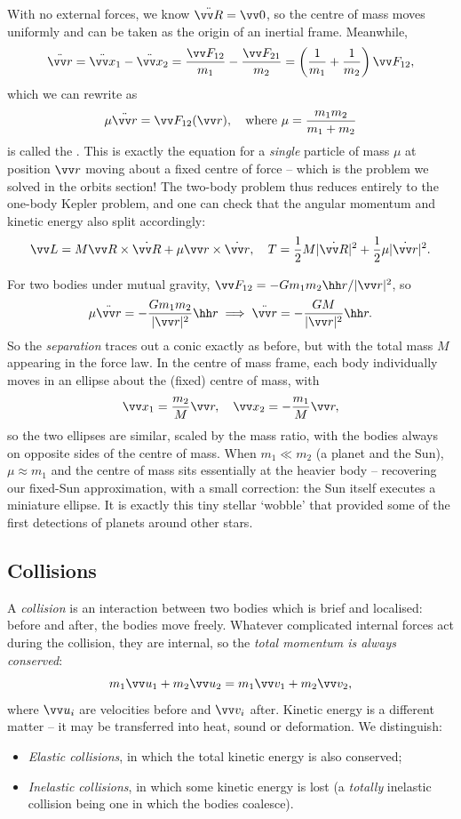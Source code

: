 With no external forces, we know $\ddot{\vv R} = \vv 0$, so the centre of mass moves uniformly and can be taken as the origin of an inertial frame. Meanwhile,
$$
\ddot{\vv r} = \ddot{\vv x}_1 - \ddot{\vv x}_2 = \frac{\vv F_{12}}{m_1} - \frac{\vv F_{21}}{m_2} = \left(\frac{1}{m_1} + \frac{1}{m_2}\right)\vv F_{12},
$$
which we can rewrite as
$$
\mu \ddot{\vv r} = \vv F_{12}(\vv r), \quad \text{where } \mu = \frac{m_1 m_2}{m_1 + m_2}
$$
is called the . This is exactly the equation for a \emph{single} particle of mass $\mu$ at position $\vv r$ moving about a fixed centre of force -- which is the problem we solved in the orbits section! The two-body problem thus reduces entirely to the one-body Kepler problem, and one can check that the angular momentum and kinetic energy also split accordingly:
$$
\vv L = M \vv R \times \dot{\vv R} + \mu \vv r \times \dot{\vv r}, \quad T = \frac{1}{2}M|\dot{\vv R}|^2 + \frac{1}{2}\mu |\dot{\vv r}|^2.
$$

\begin{example}
	For two bodies under mutual gravity, $\vv F_{12} = -Gm_1m_2 \hh r/|\vv r|^2$, so
	$$
	\mu \ddot{\vv r} = -\frac{Gm_1m_2}{|\vv r|^2}\hh r \implies \ddot{\vv r} = -\frac{GM}{|\vv r|^2}\hh r.
	$$
	So the \emph{separation} traces out a conic exactly as before, but with the total mass $M$ appearing in the force law. In the centre of mass frame, each body individually moves in an ellipse about the (fixed) centre of mass, with
	$$
	\vv x_1 = \frac{m_2}{M}\vv r, \quad \vv x_2 = -\frac{m_1}{M}\vv r,
	$$
	so the two ellipses are similar, scaled by the mass ratio, with the bodies always on opposite sides of the centre of mass. When $m_1 \ll m_2$ (a planet and the Sun), $\mu \approx m_1$ and the centre of mass sits essentially at the heavier body -- recovering our fixed-Sun approximation, with a small correction: the Sun itself executes a miniature ellipse. It is exactly this tiny stellar `wobble' that provided some of the first detections of planets around other stars.
\end{example}

\subsection{Collisions}

A \emph{collision} is an interaction between two bodies which is brief and localised: before and after, the bodies move freely. Whatever complicated internal forces act during the collision, they are internal, so the \emph{total momentum is always conserved}:
$$
m_1 \vv u_1 + m_2 \vv u_2 = m_1 \vv v_1 + m_2 \vv v_2,
$$
where $\vv u_i$ are velocities before and $\vv v_i$ after. Kinetic energy is a different matter -- it may be transferred into heat, sound or deformation. We distinguish:
\begin{itemize}
	\item \emph{Elastic collisions}, in which the total kinetic energy is also conserved;
	\item \emph{Inelastic collisions}, in which some kinetic energy is lost (a \emph{totally} inelastic collision being one in which the bodies coalesce).
\end{itemize}

